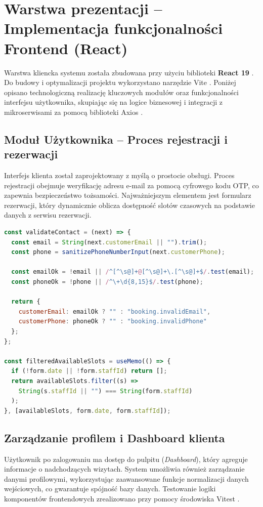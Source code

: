 \newpage
\renewcommand{\sectioncolor}{chap4}
\section{Warstwa prezentacji – Implementacja funkcjonalności Frontend (React)}

Warstwa kliencka systemu została zbudowana przy użyciu biblioteki \textbf{React 19} \cite{react_meta}. Do budowy i optymalizacji projektu wykorzystano narzędzie Vite \cite{vite_guide}. Poniżej opisano technologiczną realizację kluczowych modułów oraz funkcjonalności interfejsu użytkownika, skupiając się na logice biznesowej i integracji z mikroserwisami za pomocą biblioteki Axios \cite{axios_docs}.

\subsection{Moduł Użytkownika – Proces rejestracji i rezerwacji}
Interfejs klienta został zaprojektowany z myślą o prostocie obsługi. Proces rejestracji obejmuje weryfikację adresu e-mail za pomocą cyfrowego kodu OTP, co zapewnia bezpieczeństwo tożsamości. Najważniejszym elementem jest formularz rezerwacji, który dynamicznie oblicza dostępność slotów czasowych na podstawie danych z serwisu rezerwacji.

\begin{lstlisting}[language=JavaScript, caption={Walidacja danych kontaktowych oraz filtrowanie slotów (BookingPage.js)}]
const validateContact = (next) => {
  const email = String(next.customerEmail || "").trim();
  const phone = sanitizePhoneNumberInput(next.customerPhone);

  const emailOk = !email || /^[^\s@]+@[^\s@]+\.[^\s@]+$/.test(email);
  const phoneOk = !phone || /^\+\d{8,15}$/.test(phone);

  return {
    customerEmail: emailOk ? "" : "booking.invalidEmail",
    customerPhone: phoneOk ? "" : "booking.invalidPhone"
  };
};

const filteredAvailableSlots = useMemo(() => {
  if (!form.date || !form.staffId) return [];
  return availableSlots.filter((s) => 
    String(s.staffId || "") === String(form.staffId)
  );
}, [availableSlots, form.date, form.staffId]);
\end{lstlisting}

\subsection{Zarządzanie profilem i Dashboard klienta}
Użytkownik po zalogowaniu ma dostęp do pulpitu (\textit{Dashboard}), który agreguje informacje o nadchodzących wizytach. System umożliwia również zarządzanie danymi profilowymi, wykorzystując zaawansowane funkcje normalizacji danych wejściowych, co gwarantuje spójność bazy danych. Testowanie logiki komponentów frontendowych zrealizowano przy pomocy środowiska Vitest \cite{vitest_guide}.

